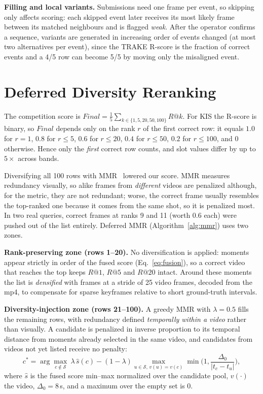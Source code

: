 \documentclass[runningheads]{llncs}
\begin{document}
\textbf{Filling and local variants.} Submissions need one frame per event, so skipping only affects scoring: each skipped event later receives its most likely frame between its matched neighbours and is flagged \emph{weak}. After the operator confirms a sequence, variants are generated in increasing order of events changed (at most two alternatives per event), since the TRAKE R-score is the fraction of correct events and a 4/5 row can become 5/5 by moving only the misaligned event.

\section{Deferred Diversity Reranking}
\label{sec:mmr}
The competition score is $\mathit{Final}=\frac15\sum_{k\in\{1,5,20,50,100\}}R@k$. For KIS the R-score is binary, so $\mathit{Final}$ depends only on the rank $r$ of the first correct row: it equals $1.0$ for $r=1$, $0.8$ for $r\le5$, $0.6$ for $r\le20$, $0.4$ for $r\le50$, $0.2$ for $r\le100$, and 0 otherwise. Hence only the \emph{first} correct row counts, and slot values differ by up to $5\times$ across bands.

Diversifying all 100 rows with MMR~\cite{carbonell1998mmr} lowered our score. MMR measures redundancy visually, so alike frames from \emph{different} videos are penalized although, for the metric, they are not redundant; worse, the correct frame usually resembles the top-ranked one because it comes from the same shot, so it is penalized most. In two real queries, correct frames at ranks 9 and 11 (worth 0.6 each) were pushed out of the list entirely. Deferred MMR (Algorithm~\ref{alg:mmr}) uses two zones.

\textbf{Rank-preserving zone (rows 1--20).} No diversification is applied: moments appear strictly in order of the fused score (Eq.~\eqref{eq:fusion}), so a correct video that reaches the top keeps $R@1$, $R@5$ and $R@20$ intact. Around these moments the list is \emph{densified} with frames at a stride of 25 video frames, decoded from the mp4, to compensate for sparse keyframes relative to short ground-truth intervals.

\textbf{Diversity-injection zone (rows 21--100).} A greedy MMR with $\lambda=0.5$ fills the remaining rows, with redundancy defined \emph{temporally within a video} rather than visually. A candidate is penalized in inverse proportion to its temporal distance from moments already selected in the same video, and candidates from videos not yet listed receive no penalty:
\begin{equation}
c^\ast=\arg\max_{c\notin\mathcal{S}}\ \lambda\,\hat{s}(c)-(1-\lambda)\max_{u\in\mathcal{S},\,v(u)=v(c)}\min\!\Big(1,\frac{\Delta_0}{|t_c-t_u|}\Big),
\label{eq:mmr}
\end{equation}
where $\hat{s}$ is the fused score min--max normalized over the candidate pool, $v(\cdot)$ the video, $\Delta_0=8$\,s, and a maximum over the empty set is 0.
\end{document}
